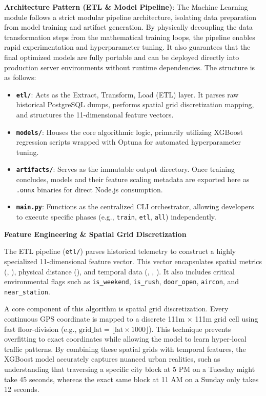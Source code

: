 \documentclass[a4paper]{article}
\begin{document}
\textbf{Architecture Pattern (ETL \& Model Pipeline)}: The Machine Learning module follows a strict modular pipeline architecture, isolating data preparation from model training and artifact generation. By physically decoupling the data transformation steps from the mathematical training loops, the pipeline enables rapid experimentation and hyperparameter tuning. It also guarantees that the final optimized models are fully portable and can be deployed directly into production server environments without runtime dependencies. The structure is as follows:
\begin{itemize}
    \item \textbf{\texttt{etl/}}: Acts as the Extract, Transform, Load (ETL) layer. It parses raw historical PostgreSQL dumps, performs spatial grid discretization mapping, and structures the 11-dimensional feature vectors.
    \item \textbf{\texttt{models/}}: Houses the core algorithmic logic, primarily utilizing XGBoost regression scripts wrapped with Optuna for automated hyperparameter tuning.
    \item \textbf{\texttt{artifacts/}}: Serves as the immutable output directory. Once training concludes, models and their feature scaling metadata are exported here as \texttt{.onnx} binaries for direct Node.js consumption.
    \item \textbf{\texttt{main.py}}: Functions as the centralized CLI orchestrator, allowing developers to execute specific phases (e.g., \texttt{train}, \texttt{etl}, \texttt{all}) independently.
\end{itemize}
\medskip

\textbf{Feature Engineering \& Spatial Grid Discretization}

The ETL pipeline (\texttt{etl/}) parses historical telemetry to construct a highly specialized 11-dimensional feature vector. This vector encapsulates spatial metrics (, ), physical distance (), and temporal data (, , ). It also includes critical environmental flags such as \texttt{is\_weekend}, \texttt{is\_rush}, \texttt{door\_open}, \texttt{aircon}, and \texttt{near\_station}. 

A core component of this algorithm is spatial grid discretization. Every continuous GPS coordinate is mapped to a discrete 111m $\times$ 111m grid cell using fast floor-division (e.g., $\text{grid\_lat} = \lfloor \text{lat} \times 1000 \rfloor$). This technique prevents overfitting to exact coordinates while allowing the model to learn hyper-local traffic patterns. By combining these spatial grids with temporal features, the XGBoost model accurately captures nuanced urban realities, such as understanding that traversing a specific city block at 5 PM on a Tuesday might take 45 seconds, whereas the exact same block at 11 AM on a Sunday only takes 12 seconds.
\end{document}
